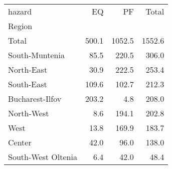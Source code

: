 \begin{tabular}{lrrr}
\toprule
hazard &     EQ &      PF &   Total \\
Region             &        &         &         \\
\midrule
Total              &  500.1 &  1052.5 &  1552.6 \\
South-Muntenia     &   85.5 &   220.5 &   306.0 \\
North-East         &   30.9 &   222.5 &   253.4 \\
South-East         &  109.6 &   102.7 &   212.3 \\
Bucharest-Ilfov    &  203.2 &     4.8 &   208.0 \\
North-West         &    8.6 &   194.1 &   202.8 \\
West               &   13.8 &   169.9 &   183.7 \\
Center             &   42.0 &    96.0 &   138.0 \\
South-West Oltenia &    6.4 &    42.0 &    48.4 \\
\bottomrule
\end{tabular}
